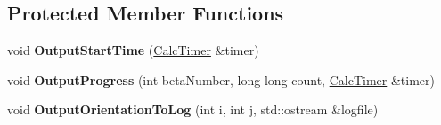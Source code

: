 \subsection*{Protected Member Functions}
\begin{DoxyCompactItemize}
\item 
\mbox{\label{class_tracer_a0e63f88ff2b5a510ae8f9894b50b1113}} 
void {\bfseries Output\+Start\+Time} (\mbox{\hyperlink{class_calc_timer}{Calc\+Timer}} \&timer)
\item 
\mbox{\label{class_tracer_ae64f2f145478e965db421f95ecc41de1}} 
void {\bfseries Output\+Progress} (int beta\+Number, long long count, \mbox{\hyperlink{class_calc_timer}{Calc\+Timer}} \&timer)
\item 
\mbox{\label{class_tracer_a83143f902694a20b395fcb5868055640}} 
void {\bfseries Output\+Orientation\+To\+Log} (int i, int j, std\+::ostream \&logfile)
\end{DoxyCompactItemize}
